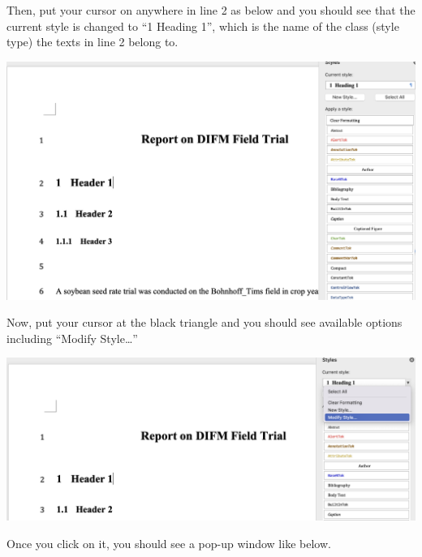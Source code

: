 \documentclass[
  letterpaper,
  DIV=11,
  numbers=noendperiod]{scrreprt}
\begin{document}
Then, put your cursor on anywhere in line 2 as below and you should see
that the current style is changed to ``1 Heading 1'', which is the name
of the class (style type) the texts in line 2 belong to.

\includegraphics[width=1\textwidth,height=\textheight]{assets/pictures/style-change-2.png}

Now, put your cursor at the black triangle and you should see available
options including ``Modify Style\ldots{}''

\includegraphics[width=1\textwidth,height=\textheight]{assets/pictures/style-change-3.png}

Once you click on it, you should see a pop-up window like below.
\end{document}
